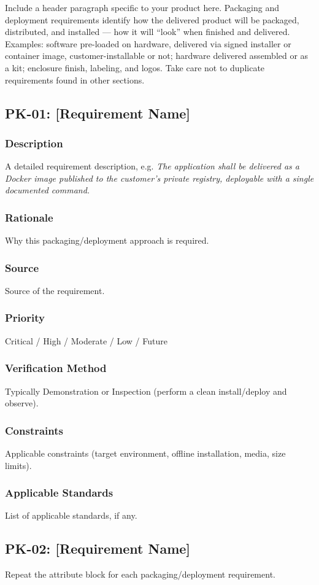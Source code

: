 Include a header paragraph specific to your product here. Packaging and deployment requirements identify how the delivered product will be packaged, distributed, and installed --- how it will ``look'' when finished and delivered. Examples: software pre-loaded on hardware, delivered via signed installer or container image, customer-installable or not; hardware delivered assembled or as a kit; enclosure finish, labeling, and logos. Take care not to duplicate requirements found in other sections.

\subsection{PK-01: [Requirement Name]}
\subsubsection{Description}
A detailed requirement description, e.g. \textit{The application shall be delivered as a Docker image published to the customer's private registry, deployable with a single documented command.}
\subsubsection{Rationale}
Why this packaging/deployment approach is required.
\subsubsection{Source}
Source of the requirement.
\subsubsection{Priority}
Critical / High / Moderate / Low / Future
\subsubsection{Verification Method}
Typically Demonstration or Inspection (perform a clean install/deploy and observe).
\subsubsection{Constraints}
Applicable constraints (target environment, offline installation, media, size limits).
\subsubsection{Applicable Standards}
List of applicable standards, if any.

\subsection{PK-02: [Requirement Name]}
Repeat the attribute block for each packaging/deployment requirement.
